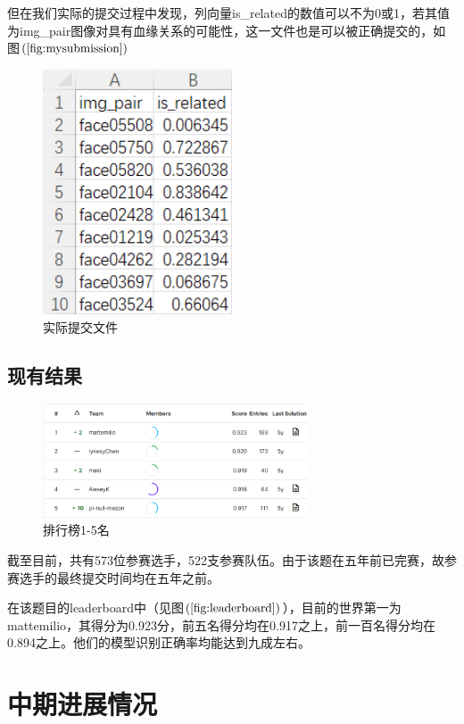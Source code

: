 \documentclass[UTF8]{ctexart}
\begin{document}
但在我们实际的提交过程中发现，列向量is\_related的数值可以不为0或1，若其值为img\_pair图像对具有血缘关系的可能性，这一文件也是可以被正确提交的，如图$\left(\ref{fig:mysubmission}\right)$
\begin{figure}[!ht]
  \centering
  \includegraphics[width=0.5\textwidth]{mysubmission.png}
  \caption{实际提交文件}
  \label{fig:mysubmission}
\end{figure}

\subsection{现有结果}
\begin{figure}[!ht]
  \centering
  \includegraphics[width=0.7\textwidth]{leaderboard.jpg}
  \caption{排行榜1-5名}
  \label{fig:leaderboard}
\end{figure}
截至目前，共有573位参赛选手，522支参赛队伍。由于该题在五年前已完赛，故参赛选手的最终提交时间均在五年之前。

在该题目的leaderboard中（见图$\left(\ref{fig:leaderboard}\right)$），目前的世界第一为mattemilio，其得分为0.923分，前五名得分均在0.917之上，前一百名得分均在0.894之上。他们的模型识别正确率均能达到九成左右。

\section{中期进展情况}
\end{document}

